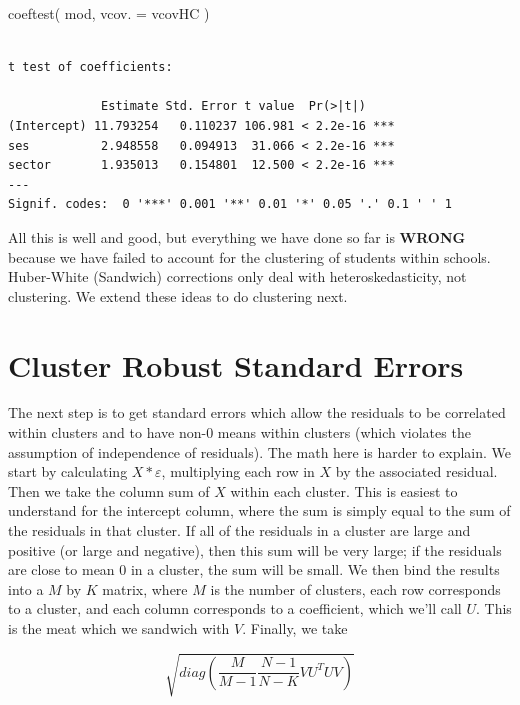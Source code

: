 \documentclass[
  letterpaper,
  DIV=11,
  numbers=noendperiod]{scrreprt}
\newenvironment{Shaded}{}{}
\newcommand{\AttributeTok}[1]{\textcolor[rgb]{0.49,0.56,0.16}{#1}}
\newcommand{\FunctionTok}[1]{\textcolor[rgb]{0.02,0.16,0.49}{#1}}
\newcommand{\NormalTok}[1]{#1}
\begin{document}
\begin{Shaded}
\begin{Highlighting}[]
\FunctionTok{coeftest}\NormalTok{( mod, }\AttributeTok{vcov. =}\NormalTok{ vcovHC )}
\end{Highlighting}
\end{Shaded}

\begin{verbatim}

t test of coefficients:

             Estimate Std. Error t value  Pr(>|t|)    
(Intercept) 11.793254   0.110237 106.981 < 2.2e-16 ***
ses          2.948558   0.094913  31.066 < 2.2e-16 ***
sector       1.935013   0.154801  12.500 < 2.2e-16 ***
---
Signif. codes:  0 '***' 0.001 '**' 0.01 '*' 0.05 '.' 0.1 ' ' 1
\end{verbatim}

All this is well and good, but everything we have done so far is
\textbf{WRONG} because we have failed to account for the clustering of
students within schools. Huber-White (Sandwich) corrections only deal
with heteroskedasticity, not clustering. We extend these ideas to do
clustering next.

\section{Cluster Robust Standard
Errors}\label{cluster-robust-standard-errors-2}

The next step is to get standard errors which allow the residuals to be
correlated within clusters and to have non-0 means within clusters
(which violates the assumption of independence of residuals). The math
here is harder to explain. We start by calculating \(X*\varepsilon\),
multiplying each row in \(X\) by the associated residual. Then we take
the column sum of \(X\) within each cluster. This is easiest to
understand for the intercept column, where the sum is simply equal to
the sum of the residuals in that cluster. If all of the residuals in a
cluster are large and positive (or large and negative), then this sum
will be very large; if the residuals are close to mean 0 in a cluster,
the sum will be small. We then bind the results into a \(M\) by \(K\)
matrix, where \(M\) is the number of clusters, each row corresponds to a
cluster, and each column corresponds to a coefficient, which we'll call
\(U\). This is the meat which we sandwich with \(V\). Finally, we take

\[\sqrt{ diag( \frac{M}{M-1}\frac{N-1}{N-K} VU^TUV)}\]
\end{document}
